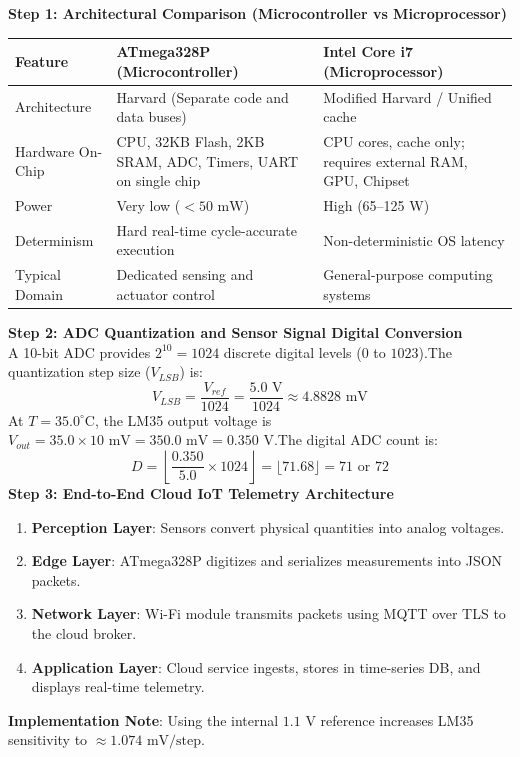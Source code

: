 \begin{solbox}
\textbf{Step 1: Architectural Comparison (Microcontroller vs Microprocessor)}\\
\begin{center}\small
\begin{tabularx}{\linewidth}{l X X}
\toprule
\textbf{Feature} & \textbf{ATmega328P (Microcontroller)} & \textbf{Intel Core i7 (Microprocessor)} \\
\midrule
Architecture & Harvard (Separate code and data buses) & Modified Harvard / Unified cache \\
Hardware On-Chip & CPU, 32KB Flash, 2KB SRAM, ADC, Timers, UART on single chip & CPU cores, cache only; requires external RAM, GPU, Chipset \\
Power & Very low ($< 50\text{ mW}$) & High (65--125 W) \\
Determinism & Hard real-time cycle-accurate execution & Non-deterministic OS latency \\
Typical Domain & Dedicated sensing and actuator control & General-purpose computing systems \\
\bottomrule
\end{tabularx}
\end{center}\vspace{2mm}
\textbf{Step 2: ADC Quantization and Sensor Signal Digital Conversion}\\A 10-bit ADC provides $2^{10} = 1024$ discrete digital levels ($0$ to $1023$).The quantization step size ($V_{LSB}$) is:\[ V_{LSB} = \frac{V_{ref}}{1024} = \frac{5.0\text{ V}}{1024} \approx 4.8828\text{ mV} \]At $T = 35.0^\circ\text{C}$, the LM35 output voltage is $V_{out} = 35.0 \times 10\text{ mV} = 350.0\text{ mV} = 0.350\text{ V}$.The digital ADC count is:\[ D = \left\lfloor \frac{0.350}{5.0} \times 1024 \right\rfloor = \lfloor 71.68 \rfloor = 71 \text{ or } 72 \]\textbf{Step 3: End-to-End Cloud IoT Telemetry Architecture}\\\begin{enumerate}[leftmargin=1.5em]\item \textbf{Perception Layer}: Sensors convert physical quantities into analog voltages.\item \textbf{Edge Layer}: ATmega328P digitizes and serializes measurements into JSON packets.\item \textbf{Network Layer}: Wi-Fi module transmits packets using MQTT over TLS to the cloud broker.\item \textbf{Application Layer}: Cloud service ingests, stores in time-series DB, and displays real-time telemetry.\end{enumerate}
\end{solbox}

\begin{examinertip}
\textbf{Implementation Note}: Using the internal $1.1\text{ V}$ reference increases LM35 sensitivity to $\approx 1.074\text{ mV/step}$.
\end{examinertip}
\vspace{4mm}
